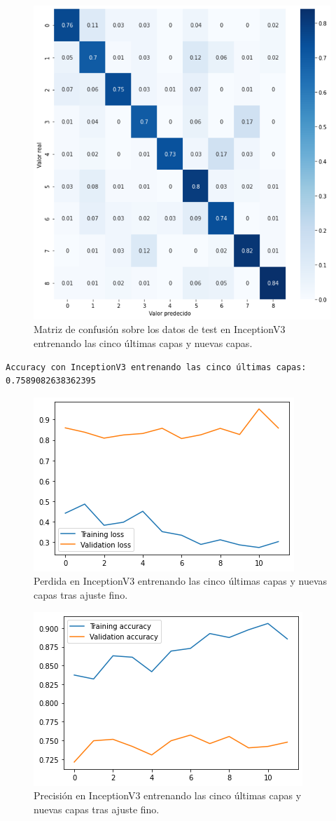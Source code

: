 \begin{figure}[H]
  \centering
  \includegraphics[width=0.5\linewidth]{Imagenes/entrenamiento_redes/5-ult/inception_5ult_matriz.png}
  \caption{Matriz de confusión sobre los datos de test en InceptionV3 entrenando las cinco últimas capas y nuevas capas.}
\end{figure}


\begin{lstlisting}
Accuracy con InceptionV3 entrenando las cinco últimas capas: 0.7589082638362395
\end{lstlisting}


\begin{figure}[H]
  \centering
  \includegraphics[width=0.5\linewidth]{Imagenes/entrenamiento_redes/5-ult/inception_5fine_loss.png}
  \caption{Perdida en InceptionV3 entrenando las cinco últimas capas y nuevas capas tras ajuste fino.}
\end{figure}

\begin{figure}[H]
  \centering
  \includegraphics[width=0.5\linewidth]{Imagenes/entrenamiento_redes/5-ult/inception_5fine_acc.png}
  \caption{Precisión en InceptionV3 entrenando las cinco últimas capas y nuevas capas tras ajuste fino.}
\end{figure}

